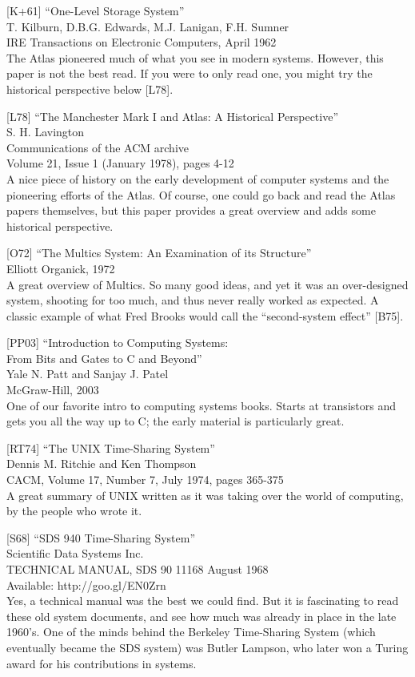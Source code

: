 {[}K+61{]} ``One-Level Storage System''\\
T. Kilburn, D.B.G. Edwards, M.J. Lanigan, F.H. Sumner\\
IRE Transactions on Electronic Computers, April 1962\\
The Atlas pioneered much of what you see in modern systems. However,
this paper is not the best read. If you were to only read one, you might
try the historical perspective below {[}L78{]}.

{[}L78{]} ``The Manchester Mark I and Atlas: A Historical
Perspective''\\
S. H. Lavington\\
Communications of the ACM archive\\
Volume 21, Issue 1 (January 1978), pages 4-12\\
A nice piece of history on the early development of computer systems and
the pioneering efforts of the Atlas. Of course, one could go back and
read the Atlas papers themselves, but this paper provides a great
overview and adds some historical perspective.

{[}O72{]} ``The Multics System: An Examination of its Structure''\\
Elliott Organick, 1972\\
A great overview of Multics. So many good ideas, and yet it was an
over-designed system, shooting for too much, and thus never really
worked as expected. A classic example of what Fred Brooks would call the
``second-system effect'' {[}B75{]}.

{[}PP03{]} ``Introduction to Computing Systems:\\
From Bits and Gates to C and Beyond''\\
Yale N. Patt and Sanjay J. Patel\\
McGraw-Hill, 2003\\
One of our favorite intro to computing systems books. Starts at
transistors and gets you all the way up to C; the early material is
particularly great.

{[}RT74{]} ``The UNIX Time-Sharing System''\\
Dennis M. Ritchie and Ken Thompson\\
CACM, Volume 17, Number 7, July 1974, pages 365-375\\
A great summary of UNIX written as it was taking over the world of
computing, by the people who wrote it.

{[}S68{]} ``SDS 940 Time-Sharing System''\\
Scientific Data Systems Inc.\\
TECHNICAL MANUAL, SDS 90 11168 August 1968\\
Available: http://goo.gl/EN0Zrn\\
Yes, a technical manual was the best we could find. But it is
fascinating to read these old system documents, and see how much was
already in place in the late 1960's. One of the minds behind the
Berkeley Time-Sharing System (which eventually became the SDS system)
was Butler Lampson, who later won a Turing award for his contributions
in systems.

